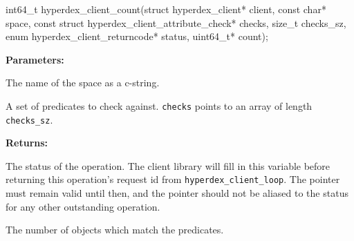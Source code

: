 \funcsep
{}
\begin{ccode}
int64_t hyperdex_client_count(struct hyperdex_client* client,
                const char* space,
                const struct hyperdex_client_attribute_check* checks, size_t checks_sz,
                enum hyperdex_client_returncode* status,
                uint64_t* count);
\end{ccode}
\funcdesc 

\noindent\textbf{Parameters:}
\begin{description}[labelindent=\widthof{{\texttt{checks}, \texttt{checks\_sz}}},leftmargin=*,noitemsep,nolistsep,align=right]
\item[\texttt{space}] The name of the space as a c-string.
\item[\texttt{checks}, \texttt{checks\_sz}] A set of predicates to check against.  \texttt{checks} points to an array of length \texttt{checks\_sz}.
\end{description}

\noindent\textbf{Returns:}
\begin{description}[labelindent=\widthof{{\texttt{status}}},leftmargin=*,noitemsep,nolistsep,align=right]
\item[\texttt{status}] The status of the operation.  The client library will fill in this variable before returning this operation's request id from \texttt{hyperdex\_client\_loop}.  The pointer must remain valid until then, and the pointer should not be aliased to the status for any other outstanding operation.
\item[\texttt{count}] The number of objects which match the predicates.
\end{description}
